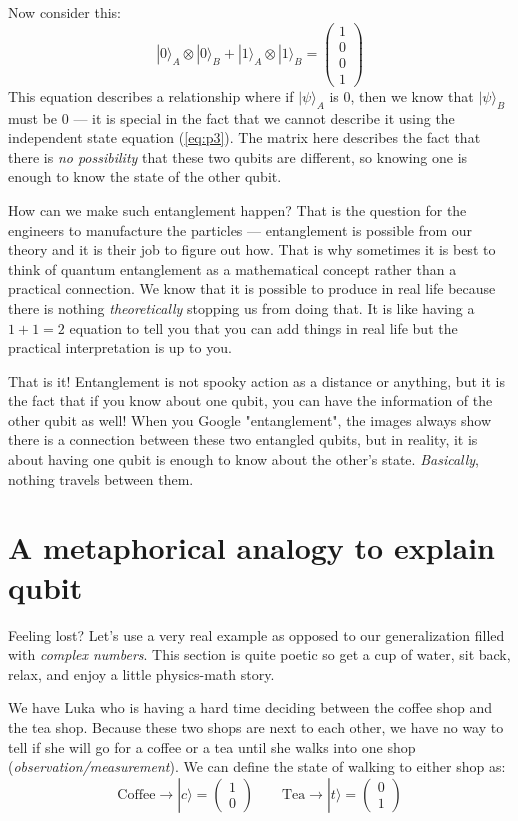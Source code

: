 Now consider this:
\begin{equation}
    |0\rangle_A \otimes |0\rangle_B +
    |1\rangle_A \otimes |1\rangle_B
    = \begin{pmatrix} 1 \\ 0 \\ 0 \\ 1 \end{pmatrix}
\end{equation}
This equation describes a relationship where if $|\psi\rangle_A$ is 0, then we know that  $|\psi\rangle_B$ must be 0 — it is special in the fact that we cannot describe it using the independent state equation (\ref{eq:p3}). The matrix here describes the fact that there is \textit{no possibility} that these two qubits are different, so knowing one is enough to know the state of the other qubit.

How can we make such entanglement happen? That is the question for the engineers to manufacture the particles — entanglement is possible from our theory and it is their job to figure out how. That is why sometimes it is best to think of quantum entanglement as a mathematical concept rather than a practical connection. We know that it is possible to produce in real life because there is nothing \textit{theoretically} stopping us from doing that. It is like having a $1+1=2$ equation to tell you that you can add things in real life but the practical interpretation is up to you.

That is it! Entanglement is not spooky action as a distance or anything, but it is the fact that if you know about one qubit, you can have the information of the other qubit as well! When you Google "entanglement", the images always show there is a connection between these two entangled qubits, but in reality, it is about having one qubit is enough to know about the other's state. \textit{Basically}, nothing travels between them.

\section{A metaphorical analogy to explain qubit}
Feeling lost? Let's use a very real example as opposed to our generalization filled with \textit{complex numbers}. This section is quite poetic so get a cup of water, sit back, relax, and enjoy a little physics-math story.

We have Luka who is having a hard time deciding between the coffee shop and the tea shop. Because these two shops are next to each other, we have no way to tell if she will go for a coffee or a tea until she walks into one shop (\textit{observation/measurement}). We can define the state of walking to either shop as:
\[
    \text{Coffee} \rightarrow |c\rangle = \begin{pmatrix} 1 \\ 0\end{pmatrix}
    \qquad
    \text{Tea} \rightarrow |t\rangle = \begin{pmatrix} 0 \\ 1\end{pmatrix}
\]

